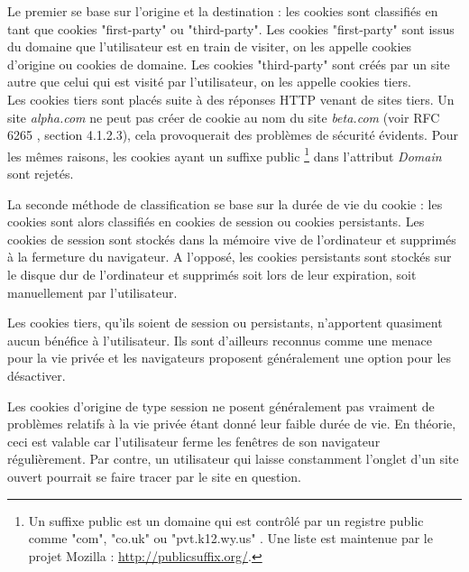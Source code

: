 Le premier se base sur l'origine et la destination : les cookies sont classifiés en tant que cookies "first-party" ou "third-party". Les cookies "first-party" sont issus du domaine que l'utilisateur est en train de visiter, on les appelle cookies d'origine ou cookies de domaine. Les cookies "third-party" sont créés par un site autre que celui qui est visité par l'utilisateur, on les appelle cookies tiers.\\
Les cookies tiers sont placés suite à des réponses HTTP venant de sites tiers. Un site \textit{alpha.com} ne peut pas créer de cookie au nom du site \textit{beta.com} (voir RFC 6265 \cite{IETF_RFC6265}, section 4.1.2.3), cela provoquerait des problèmes de sécurité évidents. Pour les mêmes raisons, les cookies ayant un suffixe public \footnote{Un suffixe public est un domaine qui est contrôlé par un registre public comme "com", "co.uk" ou "pvt.k12.wy.us" \cite{IETF_RFC6265}. Une liste est maintenue par le projet Mozilla : \url{http://publicsuffix.org/}.} dans l'attribut \textit{Domain} sont rejetés.

La seconde méthode de classification se base sur la durée de vie du cookie : les cookies sont alors classifiés en cookies de session ou cookies persistants. Les cookies de session sont stockés dans la mémoire vive de l'ordinateur et supprimés à la fermeture du navigateur. A l'opposé, les cookies persistants sont stockés sur le disque dur de l'ordinateur et supprimés soit lors de leur expiration, soit manuellement par l'utilisateur.
\newline

Les cookies tiers, qu'ils soient de session ou persistants, n'apportent quasiment aucun bénéfice à l'utilisateur. Ils sont d'ailleurs reconnus comme une menace pour la vie privée et les navigateurs proposent généralement une option pour les désactiver.

Les cookies d'origine de type session ne posent généralement pas vraiment de problèmes relatifs à la vie privée étant donné leur faible durée de vie. En théorie, ceci est valable car l'utilisateur ferme les fenêtres de son navigateur régulièrement. Par contre, un utilisateur qui laisse constamment l'onglet d'un site ouvert pourrait se faire tracer par le site en question.

